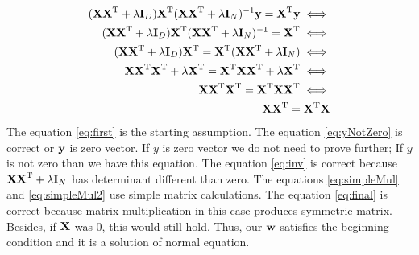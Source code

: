 \documentclass[10pt,a4paper]{article}
\begin{document}
\begin{enumerate}
\begin{enumerate}
\begin{align}
(\textbf{\text{{X}}}\textbf{\text{{X}}} ^ \text{T} + \lambda \textbf{\text{{I}}}_D)\textbf{\text{{X}}} ^ \text{T}( \textbf{\text{{X}}} \textbf{\text{{X}}} ^ \text{T}  + \lambda \textbf{\text{{I}}}_N)^{-1}\textbf{\text{{y}}} = 
\textbf{\text{{X}}} ^ \text{T}\textbf{\text{{y}}} \iff  \label{eq:first}\\
(\textbf{\text{{X}}}\textbf{\text{{X}}} ^ \text{T} + \lambda \textbf{\text{{I}}}_D)\textbf{\text{{X}}} ^ \text{T}( \textbf{\text{{X}}} \textbf{\text{{X}}} ^ \text{T}  + \lambda \textbf{\text{{I}}}_N)^{-1} = 
\textbf{\text{{X}}} ^ \text{T} \iff \label{eq:yNotZero}\\
(\textbf{\text{{X}}}\textbf{\text{{X}}} ^ \text{T} + \lambda \textbf{\text{{I}}}_D)\textbf{\text{{X}}} ^ \text{T} = 
\textbf{\text{{X}}} ^ \text{T} ( \textbf{\text{{X}}} \textbf{\text{{X}}} ^ \text{T}  + \lambda \textbf{\text{{I}}}_N)\iff \label{eq:inv}\\
\textbf{\text{{X}}}\textbf{\text{{X}}} ^ \text{T}\textbf{\text{{X}}} ^ \text{T}  + \lambda \textbf{\text{{X}}} ^ \text{T}= 
\textbf{\text{{X}}} ^ \text{T}  \textbf{\text{{X}}} \textbf{\text{{X}}} ^ \text{T}  + \lambda \textbf{\text{{X}}} ^ \text{T}\iff \label{eq:simpleMul}\\
\textbf{\text{{X}}}\textbf{\text{{X}}} ^ \text{T}\textbf{\text{{X}}} ^ \text{T} = 
\textbf{\text{{X}}} ^ \text{T}  \textbf{\text{{X}}} \textbf{\text{{X}}} ^ \text{T} \iff \label{eq:simpleMul2}\\
\textbf{\text{{X}}}\textbf{\text{{X}}} ^ \text{T} = \textbf{\text{{X}}} ^ \text{T}  \textbf{\text{{X}}} \label{eq:final}
\end{align}
The equation \ref{eq:first} is the starting assumption. The equation \ref{eq:yNotZero} is correct or $\textbf{\text{{y}}}$ is zero vector. If $y$ is zero vector we do not need to prove further; If $y$ is not zero than we have this equation. The equation \ref{eq:inv} is correct because $\textbf{\text{{X}}} \textbf{\text{{X}}} ^ \text{T}  + \lambda \textbf{\text{{I}}}_N$ has determinant different than zero. The equations \ref{eq:simpleMul} and \ref{eq:simpleMul2} use simple matrix calculations. The equation \ref{eq:final} is correct because matrix multiplication in this case produces symmetric matrix. Besides, if $\textbf{\text{{X}}}$ was 0, this would still hold.
Thus, our $\textbf{\text{{w}}}$ satisfies the beginning condition and it is a solution of normal equation.  

\end{enumerate}
\end{enumerate}
\end{document}

